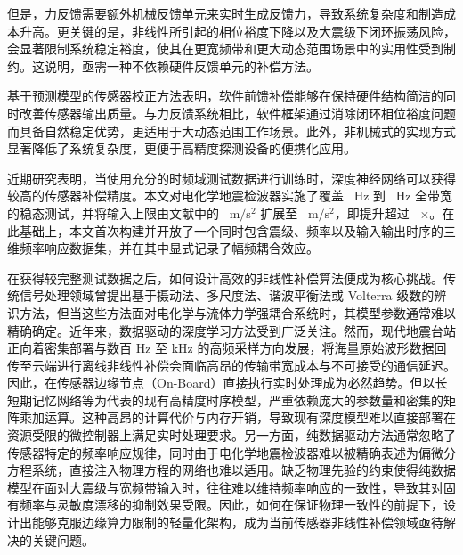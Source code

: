 \documentclass[sn-nature]{sn-jnl}
\begin{document}
但是，力反馈需要额外机械反馈单元来实时生成反馈力，导致系统复杂度和制造成本升高。更关键的是，非线性所引起的相位裕度下降以及大震级下闭环振荡风险，会显著限制系统稳定裕度，使其在更宽频带和更大动态范围场景中的实用性受到制约。这说明，亟需一种不依赖硬件反馈单元的补偿方法。

基于预测模型的传感器校正方法\cite{WOS:001409548400009}表明，软件前馈补偿能够在保持硬件结构简洁的同时改善传感器输出质量。与力反馈系统相比，软件框架通过消除闭环相位裕度问题而具备自然稳定优势，更适用于大动态范围工作场景。此外，非机械式的实现方式显著降低了系统复杂度，更便于高精度探测设备的便携化应用。

近期研究表明，当使用充分的时频域测试数据进行训练时，深度神经网络可以获得较高的传感器补偿精度\cite{HOFLER2024136528}。本文对电化学地震检波器实施了覆盖 \valFreqScanStart~Hz 到 \valFreqScanEnd~Hz 全带宽的稳态测试，并将输入上限由文献\cite{WOS:000408118700046}中的 \valSunForceAcc~$\text{m}/\text{s}^2$ 扩展至 \valMagScanEnd~$\text{m}/\text{s}^2$，即提升超过 \valInputGainExpansion~$\times$。在此基础上，本文首次构建并开放了一个同时包含震级、频率以及输入输出时序的三维频率响应数据集，并在其中显式记录了幅频耦合效应。

在获得较完整测试数据之后，如何设计高效的非线性补偿算法便成为核心挑战。传统信号处理领域曾提出基于摄动法\cite{royOptimalModifiedHomotopy2023}、多尺度法\cite{jainModelOrderReduction2020}、谐波平衡法\cite{shawHybridAveragingHarmonic2023}或 Volterra 级数\cite{helieInputOutputReduced2021}的辨识方法，但当这些方法面对电化学与流体力学强耦合系统时，其模型参数通常难以精确确定。近年来，数据驱动的深度学习方法受到广泛关注\cite{anandanatarajanDeepNeuralNetworkBased2023}。然而，现代地震台站正向着密集部署与数百 Hz 至 kHz 的高频采样方向发展，将海量原始波形数据回传至云端进行离线非线性补偿会面临高昂的传输带宽成本与不可接受的通信延迟。因此，在传感器边缘节点（On-Board）直接执行实时处理成为必然趋势。但以长短期记忆网络等为代表的现有高精度时序模型，严重依赖庞大的参数量和密集的矩阵乘加运算\cite{zhaoDetectingEarlyDamages2020, thangamalarLinearisationFlowSensors2023}。这种高昂的计算代价与内存开销，导致现有深度模型难以直接部署在资源受限的微控制器上满足实时处理要求。另一方面，纯数据驱动方法通常忽略了传感器特定的频率响应规律，同时由于电化学地震检波器难以被精确表述为偏微分方程系统，直接注入物理方程的网络\cite{wangEigenvectorBiasFourier2021}也难以适用。缺乏物理先验的约束使得纯数据模型在面对大震级与宽频带输入时，往往难以维持频率响应的一致性，导致其对固有频率与灵敏度漂移的抑制效果受限。因此，如何在保证物理一致性的前提下，设计出能够克服边缘算力限制的轻量化架构，成为当前传感器非线性补偿领域亟待解决的关键问题。
\end{document}
